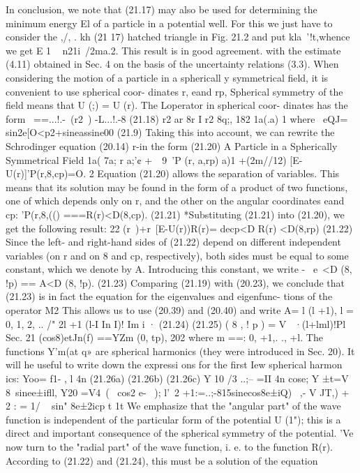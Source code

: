 \documentclass[a4paper,sfsidenotes,colorlinks=true]{tufte-book}
\numberwithin{equation}{section}
\numberwithin{figure}{section}
\begin{document}
{{{In conclusion, we note that (21.17) may also be used for determining the minimum energy El of a particle in a potential well. For this we just have to consider the
,/,
.	kh	(21 17)
hatched triangle in Fig. 21.2 and put kla~'!t,whence we get E 1 ~ n21i~/2ma.2. This result is in good agreement. with the estimate (4.11) obtained in Sec. 4 on the basis of the uncertainty relations (3.3).
When considering the motion of a particle in a sphericall y symmetrical field, it is convenient to use spherical coor- dinates r, eand rp, Spherical symmetry of the field means
that U (;) = U (r). The L\-operator in spherical coor- dinates has the form
~==...!.-~(r2~) -L...!.-8	(21.18) r2 ar 8r I r2 8q;,
182 1a(.a) 1 where ~eQJ= sin2e[O<p2+sineassine00	(21.9)
Taking this into account, we can rewrite the Schrodinger equation (20.14) r-in the form
(21.20)
A Particle in a Spherically Symmetrical Field
1a( 7a; r a;'¢ +~~9~'P (r, a,rp)
a)1 +(2m//12) [E- U(r)]'P(r,8,cp)=O.
2
Equation (21.20) allows the separation of variables. This means that its solution may be found in the form of a product of two functions, one of which depends only on r, and the other on the angular coordinates eand cp:
'P(r,8,(() ===R(r)<D(8,cp).	(21.21) *Substituting (21.21) into (21.20), we get the following
result:
22 (r~)+r~[E-U(r))R(r)= decp<D
R(r)	<D(8,rp) (21.22)
Since the left- and right-hand sides of (21.22) depend on different independent variables (on r and on 8 and cp, respectively), both sides must be equal to some constant, which we denote by A. Introducing this constant, we write
-	~e~<D (8, !p) == A<D (8, !p).	(21.23) Comparing (21.19) with (20.23), we conclude that (21.23)
is in fact the equation for the eigenvalues and eigenfunc- tions of the operator M2 This allows us to use (20.39) and (20.40) and write
A= l (l +1), l = 0, 1, 2, .. /" 2l +1	(l-I In I)!	Im
i ·
(21.24)
(21.25)
 ( 8 , ! p ) = V	~·(l+lml)!Pl
Sec. 21
(cos8)etJn(f) ==YZm (0, tp),
202
where m ==: 0, +1,. ., +l. The functions Y'm(at q» are spherical harmonics (they were introduced in Sec. 20). It will he useful to write down the expressi ons for the first	Iew	spherical	harmon ics:
Yoo= f1- , l 4n
(21.26a)
(21.26b)
(21.26c)
Y 10
/3 ..;-- =II 4n cose;	Y ±t=V 8~sinee±ifll,
Y20 =V4~( ~cos2 e- ~); l'~2 +1:=..;-815sinecos8e±iQ)~
,- V JT,) + 2 : = 1/ ~ sin" 8e±2icp
t
1t
We emphasize that the "angular part" of the wave function is independent of the particular form of the potential U (1"); this is a direct and important consequence of the spherical symmetry of the potential.
'Ve now turn to the "radial part" of the wave function, i. e. to the function R(r).	According to (21.22) and (21.24), this must be a solution of the equation
}}}
\end{document}

